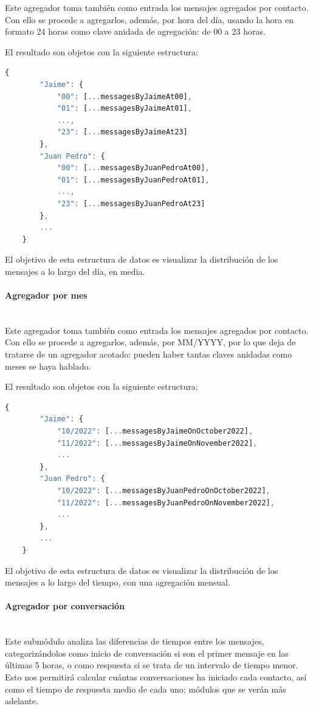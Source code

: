 Este agregador toma también como entrada los mensajes agregados por contacto. Con ello se procede a agregarlos, además, por hora del día, usando la hora en formato 24 horas como clave anidada de agregación: de 00 a 23 horas.

El resultado son objetos con la siguiente estructura:

\begin{lstlisting}[language=JavaScript]
	{
		"Jaime": {
			"00": [...messagesByJaimeAt00],
			"01": [...messagesByJaimeAt01],
			...,
			"23": [...messagesByJaimeAt23]
		},
		"Juan Pedro": {
			"00": [...messagesByJuanPedroAt00],
			"01": [...messagesByJuanPedroAt01],
			...,
			"23": [...messagesByJuanPedroAt23]
		},
		...
	}
\end{lstlisting}

El objetivo de esta estructura de datos es visualizar la distribución de los mensajes a lo largo del día, en media.

\paragraph{Agregador por mes}\mbox{}\\

Este agregador toma también como entrada los mensajes agregados por contacto. Con ello se procede a agregarlos, además, por MM/YYYY, por lo que deja de tratarse de un agregador acotado: pueden haber tantas claves anidadas como meses se haya hablado.

El resultado son objetos con la siguiente estructura:

\begin{lstlisting}[language=JavaScript]
	{
		"Jaime": {
			"10/2022": [...messagesByJaimeOnOctober2022],
			"11/2022": [...messagesByJaimeOnNovember2022],
			...
		},
		"Juan Pedro": {
			"10/2022": [...messagesByJuanPedroOnOctober2022],
			"11/2022": [...messagesByJuanPedroOnNovember2022],
			...
		},
		...
	}
\end{lstlisting}

El objetivo de esta estructura de datos es visualizar la distribución de los mensajes a lo largo del tiempo, con una agregación mensual.

\paragraph{Agregador por conversación}\mbox{}\\

Este submódulo analiza las diferencias de tiempos entre los mensajes, categorizándolos como inicio de conversación si son el primer mensaje en las últimas 5 horas, o como respuesta si se trata de un intervalo de tiempo menor. Esto nos permitirá calcular cuántas conversaciones ha iniciado cada contacto, así como el tiempo de respuesta medio de cada uno; módulos que se verán más adelante.

